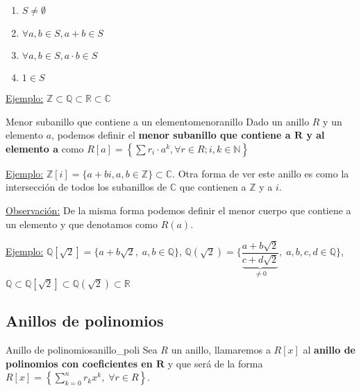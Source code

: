 \documentclass[10pt, a4paper]{article}
\newcommand{\R}{\mathbb{R}}
\newcommand{\N}{\mathbb{N}}
\newcommand{\Z}{\mathbb{Z}}
\newcommand{\C}{\mathbb{C}}
\newcommand{\Q}{\mathbb{Q}}
\newcommand{\obs}{\underline{Observación:} }
\newcommand{\ej}{\underline{Ejemplo:} }
\begin{document}
\begin{enumerate}[label=\arabic*)]
	\item $S \neq \emptyset$
	\item $\forall a, b \in S, a + b \in S$
	\item $\forall a, b \in S, a \cdot b \in S$
	\item $1 \in S$
\end{enumerate}

\vspace{3mm}

\ej $\Z \subset \Q \subset \R \subset \C$

\begin{definition}{Menor subanillo que contiene a un elemento}{menoranillo}
Dado un anillo $R$ y un elemento $a$, podemos definir el \textbf{menor subanillo que contiene a $\mathbf{R}$ y al elemento $\mathbf{a}$} como $R[a] = \left \{ \displaystyle\sum r_i \cdot a^k, \forall r \in R; i, k \in \N \right \}$
\end{definition}

\ej $\Z[i] = \{a + bi, a, b \in \Z\} \subset \C$. Otra forma de ver este anillo es como la intersección de todos los subanillos de $\C$ que contienen a $\Z$ y a $i$.

\vspace{3mm}

\obs De la misma forma podemos definir el menor cuerpo que contiene a un elemento y que denotamos como $R(a)$.

\vspace{3mm}

\ej $\Q[\sqrt{2}] = \{a + b\sqrt{2}, \; a, b \in \Q\}$, $\Q(\sqrt{2}) = \bigg \{ \dfrac{a + b\sqrt{2}}{\underbrace{c + d\sqrt{2}}_{\neq 0}}, \; a, b, c, d \in \Q \bigg \}$, $\Q \subset \Q[\sqrt{2}] \subset \Q(\sqrt{2}) \subset \R$

\subsection{Anillos de polinomios}

\vspace{3mm}

\begin{definition}{Anillo de polinomios}{anillo_poli}
Sea $R$ un anillo, llamaremos a $R[x]$ al \textbf{anillo de polinomios con coeficientes en $\mathbf{R}$} y que será de la forma $R[x] = \left \{ \displaystyle\sum_{k = 0}^{n} r_k x^k, \; \forall r \in R \right \}$.
\end{definition}
\end{document}
